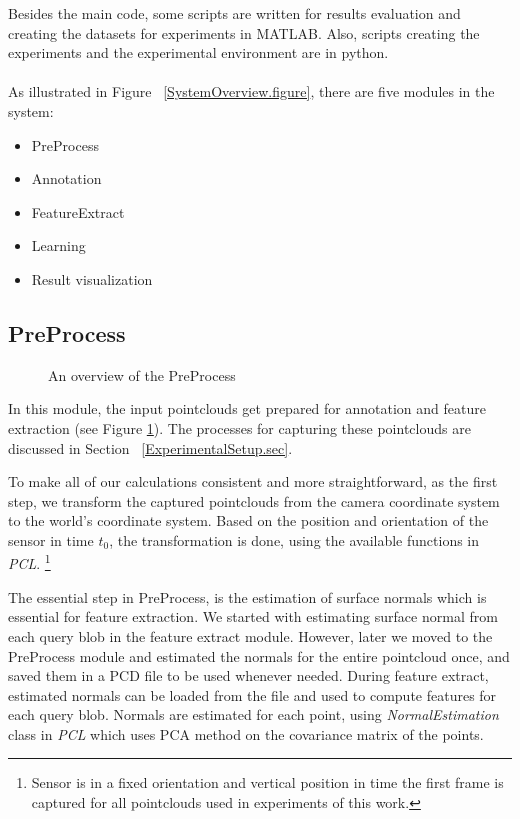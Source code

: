 Besides the main code, some scripts are written for results evaluation and creating the datasets for experiments in MATLAB. Also, 
scripts creating the experiments and the experimental environment are in python.\\
\\
As illustrated in Figure ~\ref{SystemOverview.figure}, there are five modules in the system:

\begin{itemize}
  \item PreProcess
  \item Annotation
  \item FeatureExtract
  \item Learning
  \item Result visualization
\end{itemize}

\subsection{PreProcess}
\label{PreProcess.ssec}

\begin{figure}[t]
  \caption[PreProcess overview]
  {An overview of the PreProcess}
  \label{PreProcessFlowchart.figure}
\end{figure}

 In this module, the input pointclouds get prepared for annotation and feature extraction (see Figure \ref{PreProcessFlowchart.figure}).
 The processes for capturing these pointclouds are discussed in Section ~\ref{ExperimentalSetup.sec}. 
 
 
 To make all of our calculations consistent and more straightforward, as the first step, we transform the captured pointclouds from the camera coordinate system to the world's coordinate system. Based on the position and orientation of the sensor in time $t_0$, the transformation is done, using the available functions in {\it PCL}.  
 \footnote{Sensor is in a fixed orientation and vertical position in time the first frame is captured for all pointclouds 
 used in experiments of this work.}
 
 
 The essential step in PreProcess, is the estimation of surface normals which is essential for feature extraction. %
 We started with estimating surface normal from each query blob in the feature extract module. However, later we moved to the PreProcess module and estimated the normals for the entire pointcloud once, and saved them in a PCD file to be used whenever needed. During feature extract, estimated normals can be loaded from the file and used to compute features for each query blob. Normals are estimated for each point, using {\it NormalEstimation} class in {\it PCL} which uses PCA method on the covariance matrix of the points.
 
